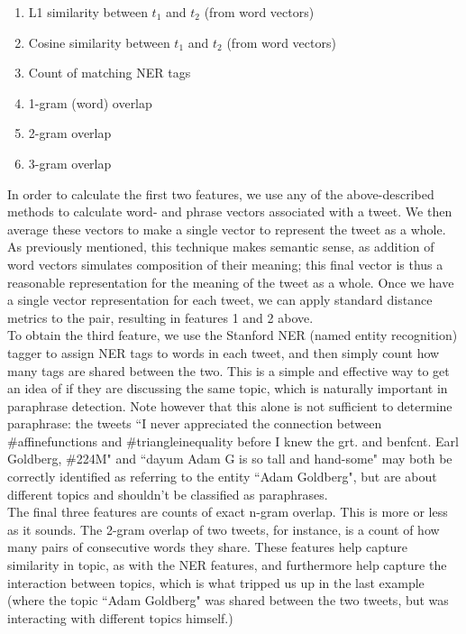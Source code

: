 \documentclass[conference]{IEEEtran}
\begin{document}
\begin{enumerate}
\item L1 similarity between $t_1$ and $t_2$ (from word vectors)
\item Cosine similarity between $t_1$ and $t_2$ (from word vectors)
\item Count of matching NER tags
\item 1-gram (word) overlap
\item 2-gram overlap
\item 3-gram overlap
\end{enumerate}

In order to calculate the first two features, we use any of the above-described methods to calculate word- and phrase vectors associated with a tweet. We then average these vectors to make a single vector to represent the tweet as a whole.  As previously mentioned, this technique makes semantic sense, as addition of word vectors simulates composition of their meaning; this final vector is thus a reasonable representation for the meaning of the tweet as a whole.  Once we have a single vector representation for each tweet, we can apply standard distance metrics to the pair, resulting in features 1 and 2 above.\\

\indent To obtain the third feature, we use the Stanford NER (named entity recognition) tagger to assign NER tags to words in each tweet, and then simply count how many tags are shared between the two.  This is a simple and effective way to get an idea of if they are discussing the same topic, which is naturally important in paraphrase detection.  Note however that this alone is not sufficient to determine paraphrase: the tweets ``I never appreciated the connection between \#affinefunctions and \#triangleinequality before I knew the grt. and benfcnt. Earl Goldberg, \#224M" and ``dayum Adam G is so tall and hand-some" may both be correctly identified as referring to the entity ``Adam Goldberg", but are about different topics and shouldn't be classified as paraphrases.\\

\indent The final three features are counts of exact n-gram overlap.  This is more or less as it sounds.  The 2-gram overlap of two tweets, for instance, is a count of how many pairs of consecutive words they share.  These features help capture similarity in topic, as with the NER features, and furthermore help capture the interaction between topics, which is what tripped us up in the last example (where the topic ``Adam Goldberg" was shared between the two tweets, but was interacting with different topics himself.)
\end{document}
